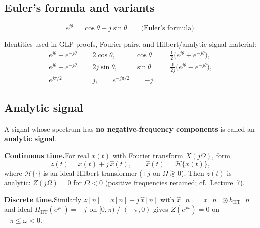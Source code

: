 
\subsection*{Euler's formula and variants}

\begin{equation*}
e^{j\theta} = \cos\theta + j\sin\theta
\qquad\text{(Euler's formula).}
\end{equation*}

\noindent Identities used in GLP proofs, Fourier pairs, and Hilbert/analytic-signal material:
\begin{align*}
e^{j\theta}+e^{-j\theta} &= 2\cos\theta, &
\cos\theta &= \tfrac{1}{2}\bigl(e^{j\theta}+e^{-j\theta}\bigr), \\
e^{j\theta}-e^{-j\theta} &= 2j\sin\theta, &
\sin\theta &= \frac{1}{2j}\bigl(e^{j\theta}-e^{-j\theta}\bigr), \\
e^{j\pi/2} &= j, \qquad e^{-j\pi/2} &= -j.
\end{align*}

\subsection*{Analytic signal}

\begin{defbox}[title={Analytic signal}]
A signal whose spectrum has \textbf{no negative-frequency components} is called an \textbf{analytic signal}.

\medskip
\noindent\textbf{Continuous time.}\quad For real $x(t)$ with Fourier transform $X(j\Omega)$, form
\begin{equation*}
z(t) = x(t) + j\,\hat{x}(t), \qquad \hat{x}(t)=\mathcal{H}\{x(t)\},
\end{equation*}
where $\mathcal{H}\{\cdot\}$ is an ideal Hilbert transformer ($\mp j$ on $\Omega\gtrless0$). Then $z(t)$ is analytic: $Z(j\Omega)=0$ for $\Omega<0$ (positive frequencies retained; cf.\ Lecture~7).

\medskip
\noindent\textbf{Discrete time.}\quad Similarly $z[n]=x[n]+j\,\hat{x}[n]$ with $\hat{x}[n]=x[n]\circledast h_{\mathrm{HT}}[n]$ and ideal $H_{\mathrm{HT}}(e^{j\omega})=\mp j$ on $[0,\pi)$ / $(-\pi,0)$ gives $Z(e^{j\omega})=0$ on $-\pi\le\omega<0$.
\end{defbox}

